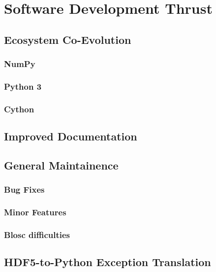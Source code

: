 \section{Software Development Thrust}

\subsection{Ecosystem Co-Evolution}

\subsubsection{NumPy}

\subsubsection{Python 3}

\subsubsection{Cython}

\subsection{Improved Documentation}

\subsection{General Maintainence}

\subsubsection{Bug Fixes} 

\subsubsection{Minor Features}

\subsubsection{Blosc difficulties}

\subsection{HDF5-to-Python Exception Translation}
